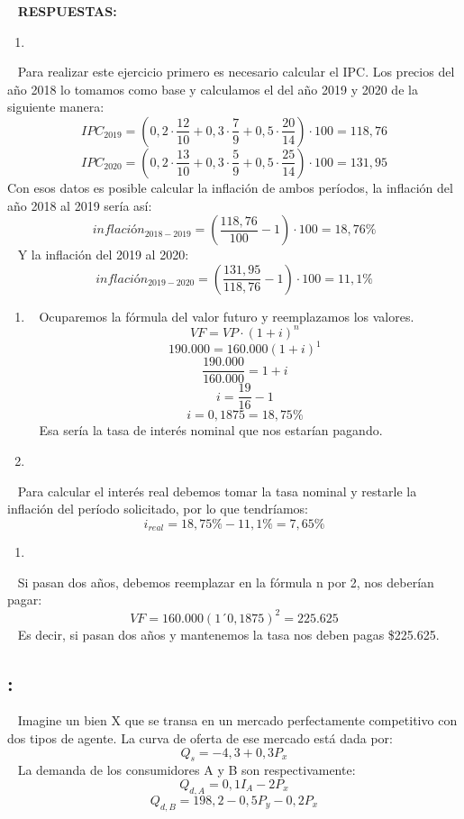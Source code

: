 \documentclass[
  letterpaper,
  DIV=11,
  numbers=noendperiod]{scrreport}
\providecommand{\tightlist}{%
  \setlength{\itemsep}{0pt}\setlength{\parskip}{0pt}}\usepackage{longtable,booktabs,array}
\begin{document}
~ \textbf{RESPUESTAS:}

\begin{enumerate}
\def\labelenumi{\alph{enumi})}
\tightlist
\item
\end{enumerate}

~ Para realizar este ejercicio primero es necesario calcular el IPC. Los
precios del año 2018 lo tomamos como base y calculamos el del año 2019 y
2020 de la siguiente manera:
\[IPC_{2019} = (0,2\cdot \frac{12}{10} + 0,3\cdot \frac{7}{9} + 0,5 \cdot \frac{20}{14}) \cdot 100 = 118,76\]
\[IPC_{2020} = (0,2\cdot \frac{13}{10} + 0,3\cdot \frac{5}{9} + 0,5 \cdot \frac{25}{14}) \cdot 100 = 131,95\]
Con esos datos es posible calcular la inflación de ambos períodos, la
inflación del año 2018 al 2019 sería así:
\[inflación_{2018-2019}=(\frac{118,76}{100}-1)\cdot100=18,76\%\] ~ Y la
inflación del 2019 al 2020:
\[inflación_{2019-2020}=(\frac{131,95}{118,76}-1)\cdot100=11,1\%\]

\begin{enumerate}
\def\labelenumi{\alph{enumi})}
\setcounter{enumi}{1}
\item
  ~ Ocuparemos la fórmula del valor futuro y reemplazamos los valores.
  \[VF =VP\cdot(1+i)^n\] \[190.000=160.000(1+i)^1\]
  \[\frac{190.000}{160.000}=1+i\] \[i=\frac{19}{16}-1\]
  \[i=0,1875=18,75\%\] ~ Esa sería la tasa de interés nominal que nos
  estarían pagando.
\item
\end{enumerate}

~ Para calcular el interés real debemos tomar la tasa nominal y restarle
la inflación del período solicitado, por lo que tendríamos:
\[i_{real} = 18,75\% - 11,1\%=7,65\%\]

\begin{enumerate}
\def\labelenumi{\alph{enumi})}
\setcounter{enumi}{3}
\tightlist
\item
\end{enumerate}

~ Si pasan dos años, debemos reemplazar en la fórmula n por 2, nos
deberían pagar: \[VF=160.000(1´0,1875)^2=225.625\] ~ Es decir, si pasan
dos años y mantenemos la tasa nos deben pagas \$225.625.

\hypertarget{section-31}{%
\subsection{:}\label{section-31}}

~ Imagine un bien X que se transa en un mercado perfectamente
competitivo con dos tipos de agente. La curva de oferta de ese mercado
está dada por: \[Q_s = -4,3+0,3P_x\] ~ La demanda de los consumidores A
y B son respectivamente: \[Q_{d,A}=0,1I_A-2P_x\]
\[Q_{d,B}=198,2 - 0,5P_y - 0,2P_x\]
\end{document}
